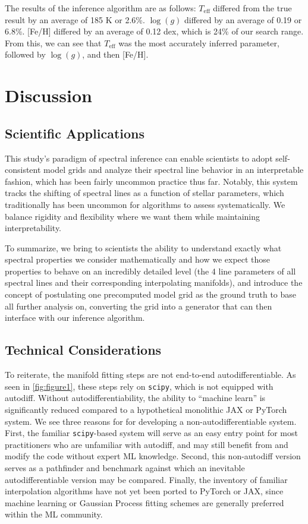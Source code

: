 \documentclass[twocolumn, linenumbers]{aastex631}
\begin{document}
The results of the inference algorithm are as follows: $T_{\mathrm{eff}}$ differed from the true result by an average of 185 K or 2.6\%.
$\log(g)$ differed by an average of 0.19 or 6.8\%. [Fe/H] differed by an average of 0.12 dex, which is 24\% of our search range.
From this, we can see that $T_{\mathrm{eff}}$ was the most accurately inferred parameter, followed by $\log(g)$, and then [Fe/H].

\section{Discussion}
\subsection{Scientific Applications}
This study's paradigm of spectral inference can enable scientists to adopt self-consistent model grids and analyze their spectral line behavior in an interpretable fashion, which has been fairly uncommon practice thus far.
Notably, this system tracks the shifting of spectral lines as a function of stellar parameters, which traditionally has been uncommon for algorithms to assess systematically.
We balance rigidity and flexibility where we want them while maintaining interpretability.

To summarize, we bring to scientists the ability to understand exactly what spectral properties we consider mathematically and how we expect those properties to behave on an incredibly detailed level (the 4 line parameters of all spectral lines and their corresponding interpolating manifolds), and introduce the concept of postulating one precomputed model grid as the ground truth to base all further analysis on, converting the grid into a generator that can then interface with our inference algorithm.

\subsection{Technical Considerations}
To reiterate, the manifold fitting steps are not end-to-end autodifferentiable.
As seen in \autoref{fig:figure1}, these steps rely on \texttt{scipy}, which is not equipped with autodiff.
Without autodifferentiability, the ability to ``machine learn'' is significantly reduced compared to a hypothetical monolithic JAX or PyTorch system.
We see three reasons for for developing a non-autodifferentiable system.
First, the familiar \texttt{scipy}-based system will serve as an easy entry point for most practitioners who are unfamiliar with autodiff, and may still benefit from and modify the code without expert ML knowledge.
Second, this non-autodiff version serves as a pathfinder and benchmark against which an inevitable autodifferentiable version may be compared.
Finally, the inventory of familiar interpolation algorithms have not yet been ported to PyTorch or JAX, since machine learning or Gaussian Process fitting schemes are generally preferred within the ML community.
\end{document}
